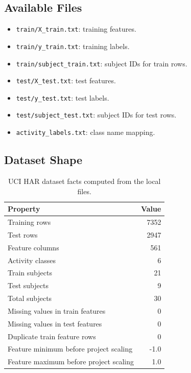 \documentclass{article}
\begin{document}
\subsection{Available Files}
\begin{itemize}
  \item \texttt{train/X\_train.txt}: training features.
  \item \texttt{train/y\_train.txt}: training labels.
  \item \texttt{train/subject\_train.txt}: subject IDs for train rows.
  \item \texttt{test/X\_test.txt}: test features.
  \item \texttt{test/y\_test.txt}: test labels.
  \item \texttt{test/subject\_test.txt}: subject IDs for test rows.
  \item \texttt{activity\_labels.txt}: class name mapping.
\end{itemize}

\subsection{Dataset Shape}
\begin{table}[H]
\centering
\begin{tabular}{lr}
\toprule
Property & Value \\
\midrule
Training rows & 7352 \\
Test rows & 2947 \\
Feature columns & 561 \\
Activity classes & 6 \\
Train subjects & 21 \\
Test subjects & 9 \\
Total subjects & 30 \\
Missing values in train features & 0 \\
Missing values in test features & 0 \\
Duplicate train feature rows & 0 \\
Feature minimum before project scaling & -1.0 \\
Feature maximum before project scaling & 1.0 \\
\bottomrule
\end{tabular}
\caption{UCI HAR dataset facts computed from the local files.}
\end{table}
\end{document}
